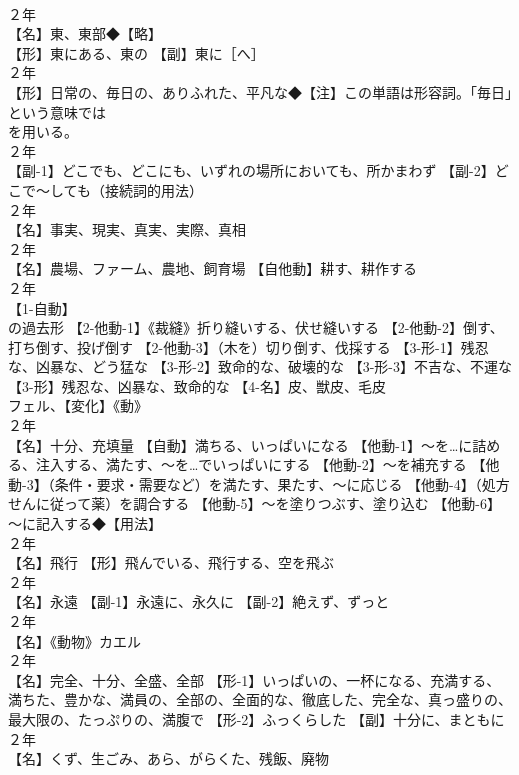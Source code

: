 \documentclass[8pt]{extreport}
\begin{document}
\begin{CJK}{UTF8}{min}
\\	２年	
\\	【名】東、東部◆【略】
\\	【形】東にある、東の 【副】東に［へ］
\\	２年	
\\	【形】日常の、毎日の、ありふれた、平凡な◆【注】この単語は形容詞。｢毎日｣という意味では 
\\	を用いる。
\\	２年	
\\	【副-1】どこでも、どこにも、いずれの場所においても、所かまわず 【副-2】どこで～しても（接続詞的用法）
\\	２年	
\\	【名】事実、現実、真実、実際、真相
\\	２年	
\\	【名】農場、ファーム、農地、飼育場 【自他動】耕す、耕作する
\\	２年	
\\	【1-自動】
\\	の過去形 【2-他動-1】《裁縫》折り縫いする、伏せ縫いする 【2-他動-2】倒す、打ち倒す、投げ倒す 【2-他動-3】（木を）切り倒す、伐採する 【3-形-1】残忍な、凶暴な、どう猛な 【3-形-2】致命的な、破壊的な 【3-形-3】不吉な、不運な 【3-形】残忍な、凶暴な、致命的な 【4-名】皮、獣皮、毛皮 
\\	フェル、【変化】《動》
\\	２年	
\\	【名】十分、充填量 【自動】満ちる、いっぱいになる 【他動-1】～を…に詰める、注入する、満たす、～を…でいっぱいにする 【他動-2】～を補充する 【他動-3】（条件・要求・需要など）を満たす、果たす、～に応じる 【他動-4】（処方せんに従って薬）を調合する 【他動-5】～を塗りつぶす、塗り込む 【他動-6】～に記入する◆【用法】
\\	２年	
\\	【名】飛行 【形】飛んでいる、飛行する、空を飛ぶ
\\	２年	
\\	【名】永遠 【副-1】永遠に、永久に 【副-2】絶えず、ずっと
\\	２年	
\\	【名】《動物》カエル
\\	２年	
\\	【名】完全、十分、全盛、全部 【形-1】いっぱいの、一杯になる、充満する、満ちた、豊かな、満員の、全部の、全面的な、徹底した、完全な、真っ盛りの、最大限の、たっぷりの、満腹で 【形-2】ふっくらした 【副】十分に、まともに
\\	２年	
\\	【名】くず、生ごみ、あら、がらくた、残飯、廃物

\end{CJK}
\end{document}
